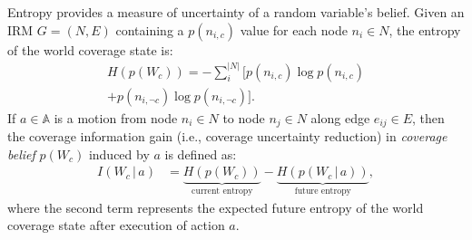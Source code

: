 \documentclass[letterpaper]{article} %
\newcommand{\ph}[1]{{\textbf{#1}:}} %
\begin{document}
\noindent
Entropy provides a measure of uncertainty of a random variable's belief. Given an IRM $G = (N, E)$ containing a $p(n_{i,c})$ value for each node $n_i \in N$, the entropy of the world coverage state is:
\begin{multline}
  H(p(W_{c})) = - \sum_{i}^{|N|}\Big[ p(n_{i,c}) \log p(n_{i,c}) \\ 
  + p(n_{i,\neg c}) \log p(n_{i,\neg c}) \Big].
\end{multline}
If $a \in \mathbb{A}$ is a motion from node $n_i \in N$ to node $n_j \in N$ along edge $e_{ij} \in E$, then the coverage information gain (i.e., coverage uncertainty reduction) in \textit{coverage belief} $p(W_{c})$ induced by $a$ is defined as:
\begin{align}
    I(W_{c} \, | \, a) &= \underbrace{H(p(W_{c}))}_\text{current entropy} - \underbrace{H(p(W_{c}\, | \, a))}_\text{future entropy},
\end{align}
where the second term represents the expected future entropy of the world coverage state after execution of action $a$. 
\end{document}
